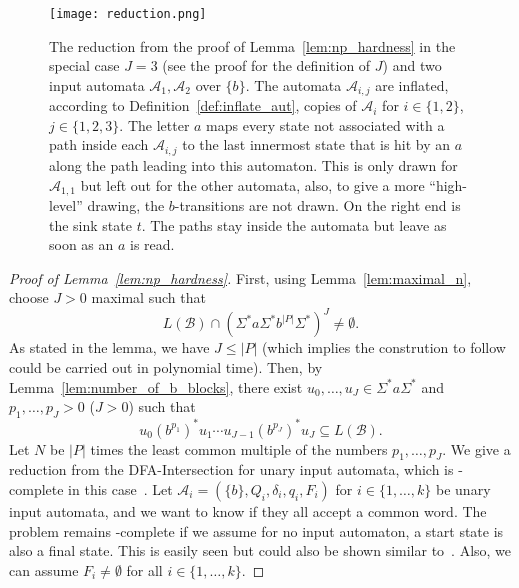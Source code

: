 \begin{toappendix}
\begin{figure}[htb]
     \centering
     \hspace*{-2.5cm}
\texttt{[image: reduction.png]}
  \caption{%
   The reduction from the proof of Lemma~\ref{lem:np_hardness}
   in the special case $J = 3$ (see the proof for the definition of $J$)
   and two input automata $\mathcal A_1, \mathcal A_2$ over $\{b\}$. The automata
   $\mathcal A_{i,j}$ are inflated, according to Definition~\ref{def:inflate_aut},
   copies of $\mathcal A_i$
   for $i \in \{1,2\}$, $j \in \{1,2,3\}$. 
   The letter $a$ maps
   every state not associated with a path inside each $\mathcal A_{i,j}$ to the last innermost state that 
   is hit by an $a$ along the path leading into this automaton. This is only drawn for $\mathcal A_{1,1}$ but left
   out for the other automata, also, to give a more ``high-level'' drawing, the $b$-transitions
   are not drawn. On the right end is the sink state $t$. The paths stay inside the automata but leave
   as soon as an $a$ is read.}
  \label{fig:reduction}
\end{figure}

\begin{proof}[Proof of Lemma~\ref{lem:np_hardness}]
First, using Lemma~\ref{lem:maximal_n},
choose $J > 0$ maximal such that
\[
 L(\mathcal B) \cap (\Sigma^* a \Sigma^* b^{|P|} \Sigma^*)^J \ne \emptyset.
\]
As stated in the lemma, we have $J \le |P|$ (which implies the constrution to follow could
be carried out in polynomial time).
Then, by Lemma~\ref{lem:number_of_b_blocks}, there
exist $u_0, \ldots, u_J \in \Sigma^* a \Sigma^*$
and $p_1, \ldots, p_J > 0$ ($J > 0$) such that 
\[
 u_0 (b^{p_1})^* u_1 \cdots u_{J-1} (b^{p_J})^* u_J \subseteq L(\mathcal B).
\]
 Let $N$ be $|P|$ times the least common multiple of the numbers $p_1, \ldots, p_J$.
 We give a reduction from the {\sc DFA-Intersection} for unary 
 input automata, which is \NP-complete in this case~\cite{stockmeyer1973word,fernau2017problems}.
 Let $\mathcal A_i = (\{b\}, Q_i, \delta_i, q_i, F_i)$
 for $i \in \{1,\ldots,k\}$ be unary input automata, and we want to know
 if they all accept a common word. The problem remains
 \NP-complete if we assume for no input automaton, a start state is also a final state.
 This is easily seen but could also be shown similar to~\cite[Proposition 1]{DBLP:conf/ictcs/Hoffmann20}.
 Also, we can assume $F_i \ne \emptyset$ for all $i \in \{1,\ldots,k\}$.


\end{proof}
\end{toappendix}

